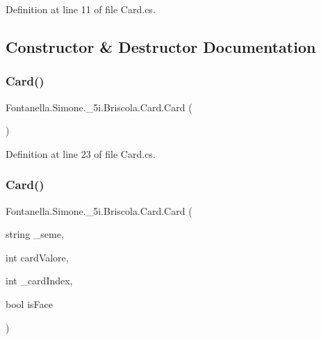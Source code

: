 Definition at line 11 of file Card.\+cs.



\subsection{Constructor \& Destructor Documentation}
\hypertarget{class_fontanella_1_1_simone_1_1__5i_1_1_briscola_1_1_card_a998d2e047284254fc568cbe8c2a49776}{}\label{class_fontanella_1_1_simone_1_1__5i_1_1_briscola_1_1_card_a998d2e047284254fc568cbe8c2a49776} 
\subsubsection{\texorpdfstring{Card()}{Card()}\hspace{0.1cm}{\footnotesize\ttfamily [1/2]}}
{\footnotesize\ttfamily Fontanella.\+Simone.\+\_\+5i.\+Briscola.\+Card.\+Card (\begin{DoxyParamCaption}{ }\end{DoxyParamCaption})}



Definition at line 23 of file Card.\+cs.

\hypertarget{class_fontanella_1_1_simone_1_1__5i_1_1_briscola_1_1_card_a9a02483c6691e2a69cd4fd49d9587d1b}{}\label{class_fontanella_1_1_simone_1_1__5i_1_1_briscola_1_1_card_a9a02483c6691e2a69cd4fd49d9587d1b} 
\subsubsection{\texorpdfstring{Card()}{Card()}\hspace{0.1cm}{\footnotesize\ttfamily [2/2]}}
{\footnotesize\ttfamily Fontanella.\+Simone.\+\_\+5i.\+Briscola.\+Card.\+Card (\begin{DoxyParamCaption}\item[{string}]{\+\_\+seme,  }\item[{int}]{card\+Valore,  }\item[{int}]{\+\_\+card\+Index,  }\item[{bool}]{is\+Face }\end{DoxyParamCaption})}



